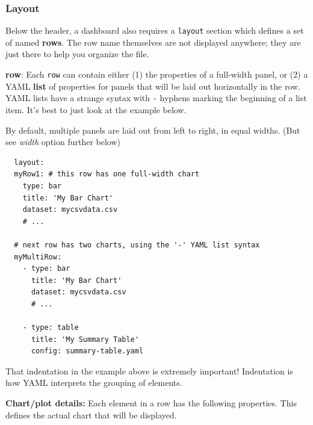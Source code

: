 \hypertarget{layout}{%
\subsubsection{Layout}\label{layout}}

Below the header, a dashboard also requires a \texttt{layout} section
which defines a set of named \textbf{rows}. The row name themselves are
not displayed anywhere; they are just there to help you organize the
file.

\textbf{row}: Each \texttt{row} can contain either (1) the properties of
a full-width panel, or (2) a YAML \textbf{list} of properties for panels
that will be laid out horizontally in the row. YAML lists have a strange
syntax with \texttt{-} hyphens marking the beginning of a list item.
It's best to just look at the example below.

By default, multiple panels are laid out from left to right, in equal widths. (But see \emph{width} option further below)

\begin{lstlisting}
  layout:
  myRow1: # this row has one full-width chart
    type: bar
    title: 'My Bar Chart'
    dataset: mycsvdata.csv
    # ...

  # next row has two charts, using the '-' YAML list syntax
  myMultiRow:
    - type: bar
      title: 'My Bar Chart'
      dataset: mycsvdata.csv
      # ...

    - type: table
      title: 'My Summary Table'
      config: summary-table.yaml
\end{lstlisting}

That indentation in the example above is extremely important!
Indentation is how YAML interprets the grouping of elements.

\textbf{Chart/plot details:} Each element in a row has the following
properties. This defines the actual chart that will be displayed.

